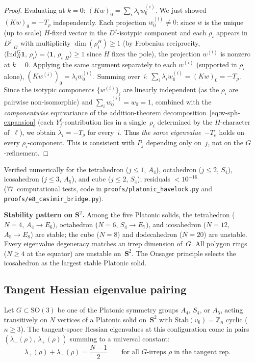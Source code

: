 \begin{proof}
Evaluating at $k = 0$: $(K w)_0 = \sum_i \lambda_i w^{(i)}_0$.
We just showed $(K w)_0 = -T_\rho$ independently.
Each projection $w^{(i)}_0 \ne 0$: since $w$ is the unique
(up to scale) $H$-fixed vector in the $D^j$-isotypic component
and each $\rho_i$ appears in $D^j|_G$ with multiplicity
$\dim(\rho_i^H) \ge 1$ (by Frobenius reciprocity,
$\langle \mathrm{Ind}_H^G \mathbf{1},\, \rho_i\rangle
= \langle \mathbf{1},\, \rho_i|_H\rangle \ge 1$
since $H$ fixes the pole), the projection $w^{(i)}$ is nonzero
at $k = 0$.
Applying the same argument separately to each
$w^{(i)}$ (supported in $\rho_i$ alone),
$(K w^{(i)})_0 = \lambda_i w^{(i)}_0$.
Summing over~$i$: $\sum_i \lambda_i w^{(i)}_0 = (Kw)_0 = -T_\rho$.
Since the isotypic components $\{w^{(i)}\}_i$ are linearly
independent (as the $\rho_i$ are pairwise non-isomorphic) and
$\sum_i w^{(i)}_0 = w_0 = 1$, combined with the
\emph{componentwise} equivariance of the addition-theorem
decomposition~\eqref{eq:w-sph-expansion} (each
$Y_j^\ell$-contribution lies in a single~$\rho_i$ determined
by the $H$-character of~$\ell$), we obtain
$\lambda_i = -T_\rho$ for every~$i$.
Thus \emph{the same eigenvalue}~$-T_\rho$ holds on every
$\rho_i$-component.  This is consistent with $P_j$ depending
only on~$j$, not on the $G$-refinement.
\end{proof}

Verified numerically for the tetrahedron ($j \le 1$, $A_4$),
octahedron ($j \le 2$, $S_4$), icosahedron ($j \le 3$, $A_5$),
and cube ($j \le 2$, $S_4$); residuals $< 10^{-16}$
(77~computational tests, code in \texttt{proofs/platonic\_havelock.py}
and \texttt{proofs/e8\_casimir\_bridge.py}).

\smallskip
\noindent
\textbf{Stability pattern on $\mathbf{S}^2$.}\enspace
Among the five Platonic solids, the tetrahedron ($N = 4$, $A_4 \to E_6$),
octahedron ($N = 6$, $S_4 \to E_7$), and icosahedron
($N = 12$, $A_5 \to E_8$) are stable; the cube ($N = 8$) and
dodecahedron ($N = 20$) are unstable.  Every eigenvalue degeneracy
matches an irrep dimension of~$G$.  All polygon rings ($N \ge 4$ at
the equator) are unstable on~$\mathbf{S}^2$.  The Onsager principle
selects the icosahedron as the largest stable Platonic solid.

\subsection{Tangent Hessian eigenvalue pairing}
\label{sec:hessian-pairing}

\begin{theorem}\label{thm:hessian-pairing}
Let $G \subset \mathrm{SO}(3)$ be one of the Platonic
symmetry groups $A_4$, $S_4$, or $A_5$, acting transitively
on $N$ vertices of a Platonic solid on~$\mathbf{S}^2$ with
$\mathrm{Stab}(v_0) = \mathbb{Z}_n$ cyclic ($n \ge 3$).
The tangent-space Hessian eigenvalues at this configuration
come in pairs $(\lambda_-(\rho),\, \lambda_+(\rho))$ summing
to a universal constant:
\begin{equation}\label{eq:hessian-pairing}
  \lambda_+(\rho) + \lambda_-(\rho) = \frac{N-1}{2}
  \qquad \text{for all $G$-irreps $\rho$ in the tangent rep}.
\end{equation}
\end{theorem}

